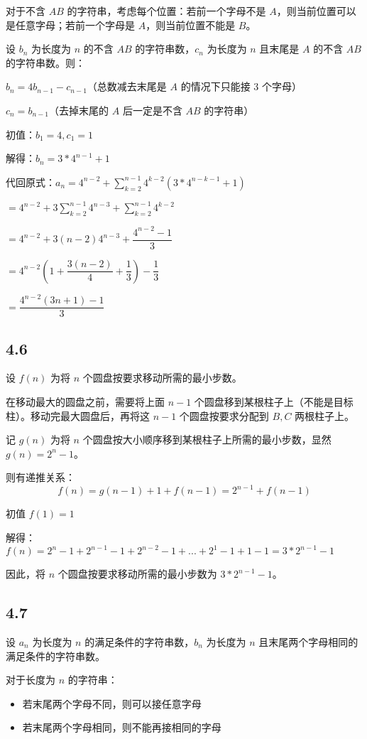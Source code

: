 \documentclass{article}
\begin{document}
对于不含 $AB$ 的字符串，考虑每个位置：若前一个字母不是 $A$，则当前位置可以是任意字母；若前一个字母是 $A$，则当前位置不能是 $B$。

设 $b_n$ 为长度为 $n$ 的不含 $AB$ 的字符串数，$c_n$ 为长度为 $n$ 且末尾是 $A$ 的不含 $AB$ 的字符串数。则：

$b_n=4b_{n-1}-c_{n-1}$（总数减去末尾是 $A$ 的情况下只能接 3 个字母）

$c_n=b_{n-1}$（去掉末尾的 $A$ 后一定是不含 $AB$ 的字符串）

初值：$b_1=4,c_1=1$

解得：$b_n=3*4^{n-1}+1$

代回原式：$a_n=4^{n-2}+\sum_{k=2}^{n-1}4^{k-2}(3*4^{n-k-1}+1)$

$=4^{n-2}+3\sum_{k=2}^{n-1}4^{n-3}+\sum_{k=2}^{n-1}4^{k-2}$

$=4^{n-2}+3(n-2)4^{n-3}+\dfrac{4^{n-2}-1}{3}$

$=4^{n-2}(1+\dfrac{3(n-2)}{4}+\dfrac{1}{3})-\dfrac{1}{3}$

$=\dfrac{4^{n-2}(3n+1)-1}{3}$



\subsection*{4.6}

设 $f(n)$ 为将 $n$ 个圆盘按要求移动所需的最小步数。

在移动最大的圆盘之前，需要将上面 $n-1$ 个圆盘移到某根柱子上（不能是目标柱）。移动完最大圆盘后，再将这 $n-1$ 个圆盘按要求分配到 $B,C$ 两根柱子上。

记 $g(n)$ 为将 $n$ 个圆盘按大小顺序移到某根柱子上所需的最小步数，显然 $g(n)=2^n-1$。

则有递推关系：
\[
f(n) = g(n-1) + 1 + f(n-1) = 2^{n-1} + f(n-1)
\]

初值 $f(1)=1$

解得：$f(n)=2^n-1+2^{n-1}-1+2^{n-2}-1+...+2^1-1+1-1=3*2^{n-1}-1$

因此，将 $n$ 个圆盘按要求移动所需的最小步数为 $3*2^{n-1}-1$。


\subsection*{4.7}

设 $a_n$ 为长度为 $n$ 的满足条件的字符串数，$b_n$ 为长度为 $n$ 且末尾两个字母相同的满足条件的字符串数。

对于长度为 $n$ 的字符串：
\begin{itemize}
    \item 若末尾两个字母不同，则可以接任意字母
    \item 若末尾两个字母相同，则不能再接相同的字母
\end{itemize}
\end{document}
